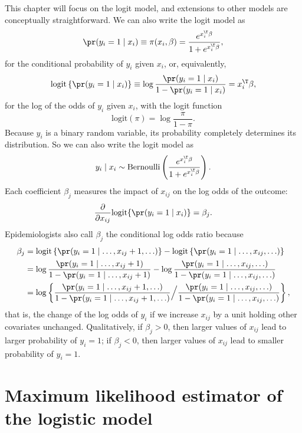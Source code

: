 This chapter will focus on the logit model, and extensions to other models are conceptually straightforward. We can also write the logit model as
\begin{equation}
\pr(y_{i}=1\mid x_{i})\equiv\pi(x_{i},\beta)=\frac{e^{x_{i}^{\T}\beta}}{1+e^{x_{i}^{\T}\beta}},\label{eq:logit-parametric-model}
\end{equation}
for the conditional probability of $y_{i}$ 
given $x_{i}$, 
or, equivalently,
\[
\text{logit}\left\{ \pr(y_{i}=1\mid x_{i})\right\} \equiv\log\frac{\pr(y_{i}=1\mid x_{i})}{1-\pr(y_{i}=1\mid x_{i})}=x_{i}^{\T}\beta,
\]
for the log of the odds of $y_{i}$ 
given $x_{i}$, with the logit function
$$
\text{logit}(\pi) = \log \frac{ \pi }{1 - \pi}. 
$$
Because $y_{i}$ is a binary random variable, its
probability completely determines its distribution. So we can also
write the logit model as
\[
y_{i}\mid x_{i}\sim\text{Bernoulli}\left(\frac{e^{x_{i}^{\T}\beta}}{1+e^{x_{i}^{\T}\beta}}\right).
\]
Each coefficient $\beta_{j}$ measures the impact of $x_{ij}$ on the log odds of the outcome:
 $$
 \frac{ \partial  }{  \partial x_{ij} }  \text{logit} \{ \pr(y_{i}=1\mid   x_i ) \} = \beta_j .
 $$
Epidemiologists also call $\beta_{j}$ the
 conditional
log odds ratio because 
\begin{align*}
\beta_{j} & =\text{logit}\left\{ \pr(y_{i}=1\mid  \ldots,x_{ij}+1,\ldots )\right\} -\text{logit}\left\{ \pr(y_{i}=1\mid  \ldots,x_{ij},\ldots )\right\} \\
 & =\log\frac{\pr(y_{i}=1\mid  \ldots,x_{ij}+1 )}{1-\pr(y_{i}=1\mid  \ldots,x_{ij}+1 )} 
 - \log\frac{\pr(y_{i}=1\mid  \ldots,x_{ij},\ldots )}{1-\pr(y_{i}=1\mid  \ldots,x_{ij},\ldots )} \\
 &= \log \left\{
 \frac{\pr(y_{i}=1\mid \ldots,x_{ij}+1,\ldots )}{1-\pr(y_{i}=1\mid  \ldots,x_{ij}+1,\ldots )} 
 \Big/
\frac{\pr(y_{i}=1\mid  \ldots,x_{ij},\ldots )}{1-\pr(y_{i}=1\mid  \ldots,x_{ij},\ldots )} 
 \right\},
\end{align*}
that is, the change of the log odds of $y_{i}$ if we increase $x_{ij}$
by a unit holding other covariates unchanged. 
Qualitatively, if $\beta_j >0$, then larger values of $x_{ij}$ lead to larger probability of $y_i = 1$; if $\beta_j < 0$, then larger values of $x_{ij}$ lead to smaller probability of $y_i = 1$. 



\section{Maximum likelihood estimator of the logistic model}

